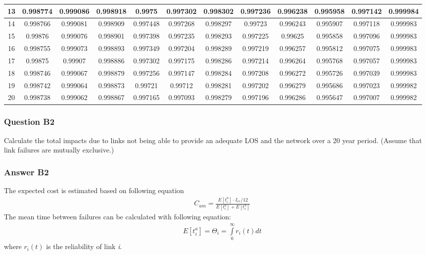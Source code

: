 \begin{table}[h]
\begin{tabular}{|c|c|c|c|c|c|c|c|c|c|c|c|}
\hline
13 & 0.998774 & 0.999086 & 0.998918 & 0.9975 & 0.997302 & 0.998302 & 0.997236 & 0.996238 & 0.995958 & 0.997142 & 0.999984 \\ 
\hline
14 & 0.998766 & 0.999081 & 0.998909 & 0.997448 & 0.997268 & 0.998297 & 0.99723 & 0.996243 & 0.995907 & 0.997118 & 0.999983 \\ 
\hline
15 & 0.99876 & 0.999076 & 0.998901 & 0.997398 & 0.997235 & 0.998293 & 0.997225 & 0.99625 & 0.995858 & 0.997096 & 0.999983 \\ 
\hline
16 & 0.998755 & 0.999073 & 0.998893 & 0.997349 & 0.997204 & 0.998289 & 0.997219 & 0.996257 & 0.995812 & 0.997075 & 0.999983 \\ 
\hline
17 & 0.99875 & 0.99907 & 0.998886 & 0.997302 & 0.997175 & 0.998286 & 0.997214 & 0.996264 & 0.995768 & 0.997057 & 0.999983 \\ 
\hline
18 & 0.998746 & 0.999067 & 0.998879 & 0.997256 & 0.997147 & 0.998284 & 0.997208 & 0.996272 & 0.995726 & 0.997039 & 0.999983 \\ 
\hline
19 & 0.998742 & 0.999064 & 0.998873 & 0.99721 & 0.99712 & 0.998281 & 0.997202 & 0.996279 & 0.995686 & 0.997023 & 0.999982 \\ 
\hline
20 & 0.998738 & 0.999062 & 0.998867 & 0.997165 & 0.997093 & 0.998279 & 0.997196 & 0.996286 & 0.995647 & 0.997007 & 0.999982 \\ 
\hline
\end{tabular}
\label{tblavaimain:14}
\end{table}
\subsubsection{Question B2}
Calculate the total impacts due to links not being able to provide an
adequate LOS and the network over a 20 year period. (Assume that link failures
are mutually exclusive.)
\subsubsection{Answer B2}
The expected cost is estimated based on following equation 
\begin{eqnarray}
&& {C_{am}} = \frac{{E\left[ {t_i^n} \right] \cdot {I_{cr}}/12}}{{E\left[ {t_i^a}
\right] + E\left[ {t_i^n} \right]}}
\label{eqavaimain:12}
\end{eqnarray}
The mean time between failures can be calculated with following
equation:
\begin{eqnarray}
&& E\left[ {t_i^a} \right] = {\Theta _i} = \int\limits_0^\infty  {{r_i}(t)dt} 
\label{eqavaimain:13}
\end{eqnarray}
where ${r_i}(t)$ is the reliability of link \textit{i}.


